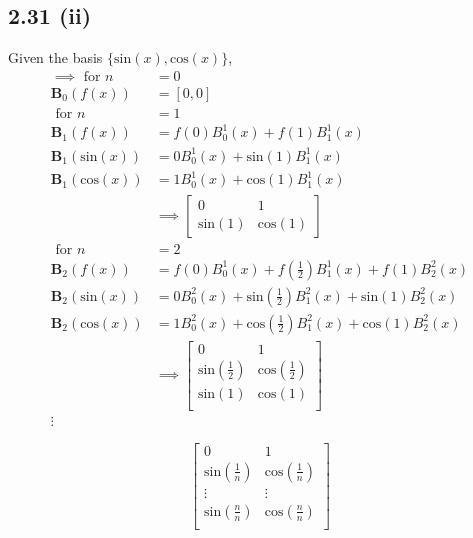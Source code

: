 \documentclass[letterpaper,12pt]{article}
\theoremstyle{definition}
\begin{document}
\subsection*{2.31 (ii)}
Given the basis $\{\text{sin} (x) , \text{cos} (x) \}$, 
\begin{align*}
    \implies 
    \text{ for } n &= 0\\
    \mathbf{B}_0(f(x)) &= [0,0]\\
    \text{ for } n &= 1\\
    \mathbf{B}_1(f(x)) &= f(0)B_0^1(x) +f(1)B_1^1(x)  \\
    \mathbf{B}_1(\text{sin} (x) ) &= 0B_0^1(x) +\text{sin} (1) B_1^1(x)  \\
    \mathbf{B}_1(\text{cos} (x) ) &= 1B_0^1(x) +\text{cos} (1) B_1^1(x)  \\
    &\implies
    \begin{bmatrix}
        0 & 1 \\
        \text{sin} (1) & \text{cos} (1) 
    \end{bmatrix}\\
    \text{ for } n &= 2\\
    \mathbf{B}_2(f(x)) &= f(0)B_0^1(x) + f(\frac{1}{2})B_1^1(x)  + f(1) B^2_2(x)  \\
    \mathbf{B}_2(\text{sin} (x) ) &= 0B_0^2(x) +\text{sin} (\frac{1}{2}) B_1^2(x) + \text{sin} (1) B_2^2(x)  \\
    \mathbf{B}_2(\text{cos} (x) ) &= 1B_0^2(x) +\text{cos} (\frac{1}{2}) B_1^2(x) + \text{cos} (1) B_2^2(x)  \\
    &\implies
    \begin{bmatrix}
        0 & 1 \\
        \text{sin} (\frac{1}{2}) & \text{cos} (\frac{1}{2}) \\
        \text{sin} (1) & \text{cos} (1) \\
    \end{bmatrix}\\
    \vdots
\end{align*}

\[
\begin{bmatrix}
    0 & 1\\
    \text{sin} (\frac{1}{n}) & \text{cos} (\frac{1}{n}) \\
    \vdots & \vdots\\
    \text{sin} (\frac{n}{n}) & \text{cos} (\frac{n}{n}) \\
\end{bmatrix}
\]
\end{document}
